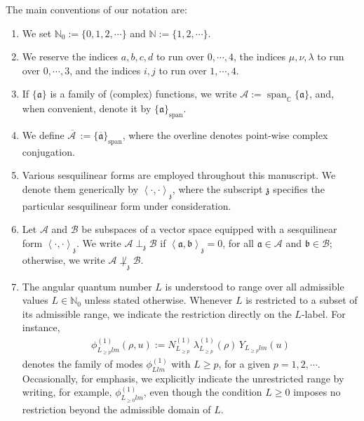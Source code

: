 \documentclass[aps,twocolumn,nofootinbib]{revtex4}
\begin{document}
The main conventions of our notation are:
\begin{enumerate}
    \item{We set $\mathbb{N}_0:=\{0,1,2,\cdots\}$ and $\mathbb{N}:=\{1,2,\cdots\}$.}
    
    \item{We reserve the indices $a,b,c,d$ to run over $0,\cdots,4$, the indices $\mu,\nu,\lambda$ to run over $0,\cdots,3$, and the indices $i,j$ to run over $1,\cdots,4$.}
    
    \item{If $\{\mathfrak a\}$ is a family of (complex) functions, we write ${\mathcal{A}}:=\operatorname{span}_{\mathbb C}\{\mathfrak a\}$, and, when convenient, denote it by $\{\mathfrak a\}_{\mathrm{span}}$.}

    \item{We define $\overline{{\mathcal{A}}\,} :=\{\overline{\mathfrak{a}}\}_{\mathrm{span}}$, where the overline denotes point-wise complex conjugation.}
    
    \item{Various sesquilinear forms are employed throughout this manuscript. We denote them generically by $\left\langle\cdot,\cdot\right\rangle_{\mathfrak{z}}$, where the subscript $\mathfrak{z}$ specifies the particular sesquilinear form under consideration.}

    \item{Let ${\mathcal{A}}$ and $\mathcal{B}$ be subspaces of a vector space equipped with a sesquilinear form $\left\langle\cdot,\cdot\right\rangle_{\mathfrak{z}}$. We write ${\mathcal{A}}\perp_{\mathfrak{z}} {\mathcal{B}}$ if $\left\langle\mathfrak{a},\mathfrak{b}\right\rangle_{\mathfrak{z}}=0$, for all $\mathfrak{a}\in{\mathcal{A}}$ and $\mathfrak{b}\in{\mathcal{B}}$; otherwise, we write ${\mathcal{A}}\not\perp_{\mathfrak{z}}{\mathcal{B}}$.}

    \item{The angular quantum number $L$ is understood to range over all admissible values $L\in\mathbb N_0$ unless stated otherwise. Whenever $L$ is restricted to a subset of its admissible range, we indicate the restriction directly on the $L$-label. For instance,
    \begin{align*}
        \phi^{(1)}_{L^{}_{\geqslant p}lm}(\rho,u) := N^{(1)}_{L^{}_{\geqslant p}}\, \lambda^{(1)}_{L^{}_{\geqslant p}}(\rho)\, Y^{}_{L^{}_{\geqslant p}lm}(u)
    \end{align*}
    denotes the family of modes $\phi^{(1)}_{Llm}$ with $L\geqslant p$, for a given $p=1,2,\cdots$. Occasionally, for emphasis, we explicitly indicate the unrestricted range by writing, for example, $\phi^{(1)}_{L^{}_{\geqslant 0}lm}$, even though the condition $L\geqslant 0$ imposes no restriction beyond the admissible domain of $L$.}
\end{enumerate}
\end{document}
